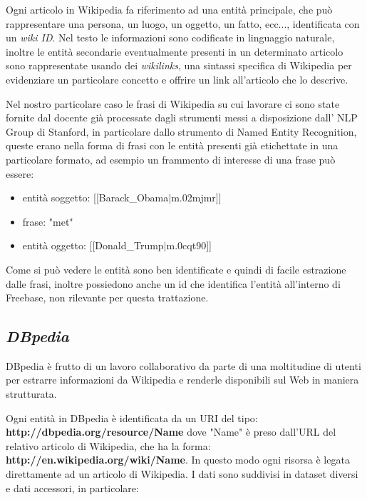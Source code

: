 \documentclass[10pt,a4paper,twocolumn]{article}
\begin{document}
Ogni articolo in Wikipedia fa riferimento ad una entità principale, che può rappresentare una persona, un luogo, un oggetto, un fatto, ecc..., identificata con un \textit{wiki ID}. Nel testo le informazioni sono codificate in linguaggio naturale, inoltre le entità secondarie eventualmente presenti in un determinato articolo sono rappresentate usando dei \textit{wikilinks}, una sintassi specifica di Wikipedia per evidenziare un particolare concetto e offrire un link all'articolo che lo descrive.

Nel nostro particolare caso le frasi di Wikipedia su cui lavorare ci sono state fornite dal docente già processate dagli strumenti messi a disposizione dall' NLP Group di Stanford, in particolare dallo strumento di Named Entity Recognition, queste erano nella forma di frasi con le entità presenti già etichettate in una particolare formato, ad esempio un frammento di interesse di una frase può essere:

\begin{itemize}
	\item entità soggetto: [[Barack\_Obama$|$m.02mjmr]]
	\item frase: "met"
	\item entità oggetto: [[Donald\_Trump$|$m.0cqt90]]
\end{itemize}

Come si può vedere le entità sono ben identificate e quindi di facile estrazione dalle frasi, inoltre possiedono anche un id che identifica l'entità all'interno di Freebase, non rilevante per questa trattazione.

\subsection*{\textit{DBpedia}}

DBpedia è frutto di un lavoro collaborativo da parte di una moltitudine di utenti per estrarre informazioni da Wikipedia e renderle disponibili sul Web in maniera strutturata.

Ogni entità in DBpedia è identificata da un URI del tipo:
\bigbreak
\textbf{http://dbpedia.org/resource/Name}
\bigbreak
dove "Name" è preso dall'URL del relativo articolo di Wikipedia, che ha la forma:
\bigbreak
\textbf{http://en.wikipedia.org/wiki/Name}.
\bigbreak
In questo modo ogni risorsa è legata direttamente ad un articolo di Wikipedia. I dati sono suddivisi in dataset diversi e dati accessori, in particolare:
\end{document}
